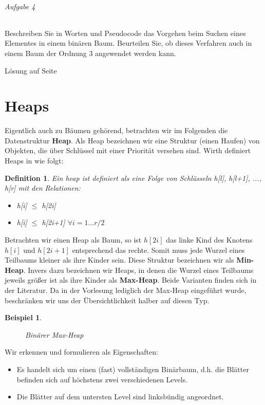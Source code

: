 \documentclass[11pt,a4paper]{scrartcl}
\newtheorem{definition}{Definition}
\newtheorem{example}{Beispiel}
\begin{document}
\paragraph{Aufgabe 4}
Beschreiben Sie in Worten und Pseudocode das Vorgehen beim Suchen eines Elementes in einem binären Baum. Beurteilen Sie, ob dieses Verfahren auch in einem Baum der Ordnung 3 angewendet werden kann.
\begin{flushright}
Lösung auf Seite \pageref{a4.4:lsg}
\end{flushright}
\pagebreak
\part{Heaps}
Eigentlich auch zu Bäumen gehörend, betrachten wir im Folgenden die Datenstruktur \textbf{Heap}. Als Heap bezeichnen wir eine Struktur (einen {\glqq}Haufen{\grqq}) von Objekten, die über Schlüssel mit einer Priorität versehen sind. Wirth definiert Heaps in \parencite[][S. 92]{Wirth} wie folgt:
\begin{definition}
Ein heap ist definiert als eine Folge von Schlüsseln h[l], h[l+1], ..., h[r] mit den Relationen:
\begin{itemize}
\item h[i] $\leq$ h[2i]
\item h[i] $\leq$ h[2i+1] $\forall i = 1 ... r/2$
\end{itemize}
\end{definition}
Betrachten wir einen Heap als Baum, so ist $h[2i]$ das linke Kind des Knotens $h[i]$ und $h[2i+1]$ entsprechend das rechte. Somit muss jede Wurzel eines Teilbaums kleiner als ihre Kinder sein. Diese Struktur bezeichnen wir als \textbf{Min-Heap}. Invers dazu bezeichnen wir Heaps, in denen die Wurzel eines Teilbaums jeweils größer ist als ihre Kinder als \textbf{Max-Heap}. Beide Varianten finden sich in der Literatur. Da in der Vorlesung lediglich der Max-Heap eingeführt wurde, beschränken wir uns der Übersichtlichkeit halber auf diesen Typ.
\begin{example}
\begin{figure}[h]
\centering
{}
\caption{Binärer Max-Heap}
\end{figure}
\end{example}
Wir erkennen und formulieren als Eigenschaften:
\begin{itemize}
\item Es handelt sich um einen (fast) vollständigen Binärbaum, d.h. die Blätter befinden sich auf höchstens zwei verschiedenen Levels.
\item Die Blätter auf dem untersten Level sind linksbündig angeordnet.
\end{itemize}
\end{document}
